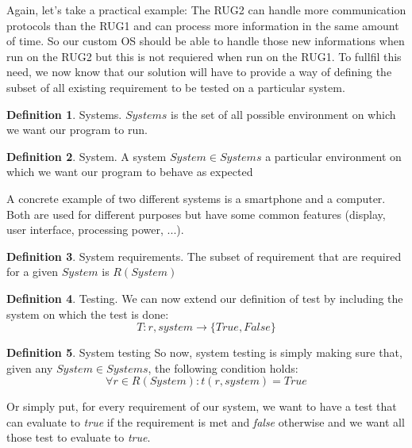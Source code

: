 \documentclass[12pt]{article}
\theoremstyle{definition}
\newtheorem{definition}{Definition}[section]
\theoremstyle{definition}
\theoremstyle{remark}
\begin{document}
Again, let's take a practical example: The RUG2 can handle more communication protocols than the RUG1 and can process more information in the same amount of time. So our custom OS should be able to handle those new informations when run on the RUG2 but this is not requiered when run on the RUG1. To fullfil this need, we now know that our solution will have to provide a way of defining the subset of all existing requirement to be tested on a particular system.\\

\theoremstyle{definition}
\begin{definition}{Systems.} $Systems$ is the set of all possible environment on which we want our program to run.
\end{definition}

\theoremstyle{definition}
\begin{definition}{System.} A system $System \in Systems$ a particular environment on which we want our program to behave as expected
\end{definition}

A concrete example of two different systems is a smartphone and a computer. Both are used for different purposes but have some common features (display, user interface, processing power, ...).

\theoremstyle{definition}
\begin{definition}{System requirements.} The subset of requirement that are required for a given $System$ is $R(System)$
\end{definition}

\theoremstyle{definition}
\begin{definition}{Testing.} We can now extend our definition of test by including the system on which the test is done:
$$T: r, system \to \{True, False\}$$
\end{definition}

\theoremstyle{definition}
\begin{definition}{System testing} So now, system testing is simply making sure that, given any $System \in Systems$, the following condition holds:
$$
\forall r \in R(System): t(r, system) = True
$$
\end{definition}

Or simply put, for every requirement of our system, we want to have a test that can evaluate to \textit{true} if the requirement is met and \textit{false} otherwise and we want all those test to evaluate to \textit{true}.


\end{document}
